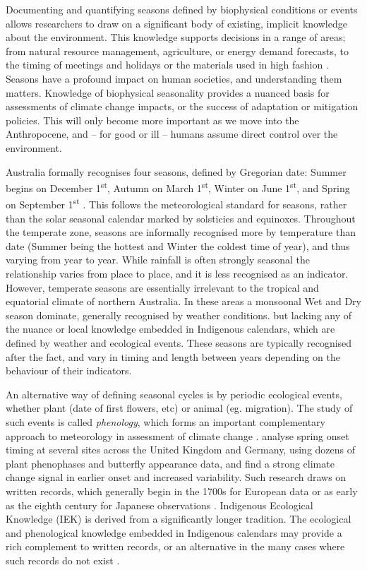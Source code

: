 Documenting and quantifying seasons defined by biophysical conditions
or events allows researchers to draw on a significant body of existing,
implicit knowledge about the environment.
%
This knowledge supports decisions in a range of areas; from natural
resource management, agriculture, or energy demand forecasts, to
the timing of meetings and holidays or the materials used in high fashion .
Seasons have a profound impact on human societies, and understanding
them matters.  Knowledge of biophysical seasonality provides a nuanced
basis for assessments of climate change impacts, or the success of
adaptation or mitigation policies.  This will only become more important
as we move into the Anthropocene, and -- for good or ill -- humans assume
direct control over the environment.


Australia formally recognises four seasons, defined by Gregorian date:
Summer begins on December 1\textsuperscript{st}, Autumn on March
1\textsuperscript{st}, Winter on June 1\textsuperscript{st}, and Spring
on September 1\textsuperscript{st} \citep{wells2013}. This follows the
meteorological standard for seasons, rather
than the solar seasonal calendar marked by solsticies and equinoxes.
%
Throughout the temperate zone, seasons are informally recognised more by
temperature than date (Summer being the hottest and Winter the coldest time
of year), and thus varying from year to year.  While rainfall is often
strongly  seasonal the relationship varies from place to place, and it is
less recognised as an indicator.
%
However, temperate seasons are essentially irrelevant to the tropical and
equatorial climate of northern Australia.  In these areas a monsoonal Wet
and Dry season dominate, generally recognised by weather conditions.
but lacking any of the nuance or local knowledge embedded in Indigenous
calendars, which are defined by weather and ecological events.  These
seasons are typically recognised after the fact, and vary in timing and
length between years depending on the behaviour of their indicators.


An alternative way of defining seasonal cycles is by periodic ecological
events, whether plant (date of first flowers, etc) or animal (eg. migration).
The study of such events is called \textit{phenology}, which forms an
important complementary approach to meteorology in assessment of climate
change \citep[eg.][]{roy2000}.  \citet{menzel2006} analyse spring onset timing
at several sites across the United Kingdom and Germany, using dozens of
plant phenophases and butterfly appearance data, and find a strong climate
change signal in earlier onset and increased variability.  Such research
draws on written records, which generally begin in the 1700s for European
data or as early as the eighth century for Japanese observations \citep{sparks2002}.
%
Indigenous Ecological Knowledge (IEK) is derived from a significantly longer
tradition.  The ecological and phenological knowledge embedded
in Indigenous calendars may provide a rich complement to written records,
or an alternative in the many cases where such records do not exist .


